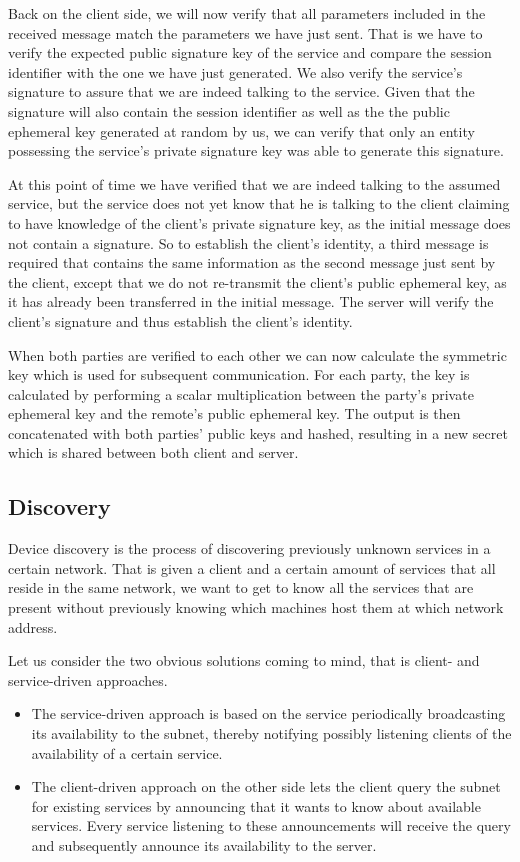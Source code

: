 Back on the client side, we will now verify that all parameters included in the received message match the parameters we have just sent.
That is we have to verify the expected public signature key of the service and compare the session identifier with the one we have just generated.
We also verify the service's signature to assure that we are indeed talking to the service.
Given that the signature will also contain the session identifier as well as the the public ephemeral key generated at random by us, we can verify that only an entity possessing the service's private signature key was able to generate this signature.

At this point of time we have verified that we are indeed talking to the assumed service, but the service does not yet know that he is talking to the client claiming to have knowledge of the client's private signature key, as the initial message does not contain a signature.
So to establish the client's identity, a third message is required that contains the same information as the second message just sent by the client, except that we do not re-transmit the client's public ephemeral key, as it has already been transferred in the initial message.
The server will verify the client's signature and thus establish the client's identity.

When both parties are verified to each other we can now calculate the symmetric key which is used for subsequent communication.
For each party, the key is calculated by performing a scalar multiplication between the party's private ephemeral key and the remote's public ephemeral key.
The output is then concatenated with both parties' public keys and hashed, resulting in a new secret which is shared between both client and server.

\subsection{Discovery}
\label{sec:discovery}

Device discovery is the process of discovering previously unknown services in a certain network.
That is given a client and a certain amount of services that all reside in the same network, we want to get to know all the services that are present without previously knowing which machines host them at which network address.

Let us consider the two obvious solutions coming to mind, that is client- and service-driven approaches.
\begin{itemize}
    \item The service-driven approach is based on the service periodically broadcasting its availability to the subnet, thereby notifying possibly listening clients of the availability of a certain service.
    \item The client-driven approach on the other side lets the client query the subnet for existing services by announcing that it wants to know about available services.
        Every service listening to these announcements will receive the query and subsequently announce its availability to the server.
\end{itemize}

